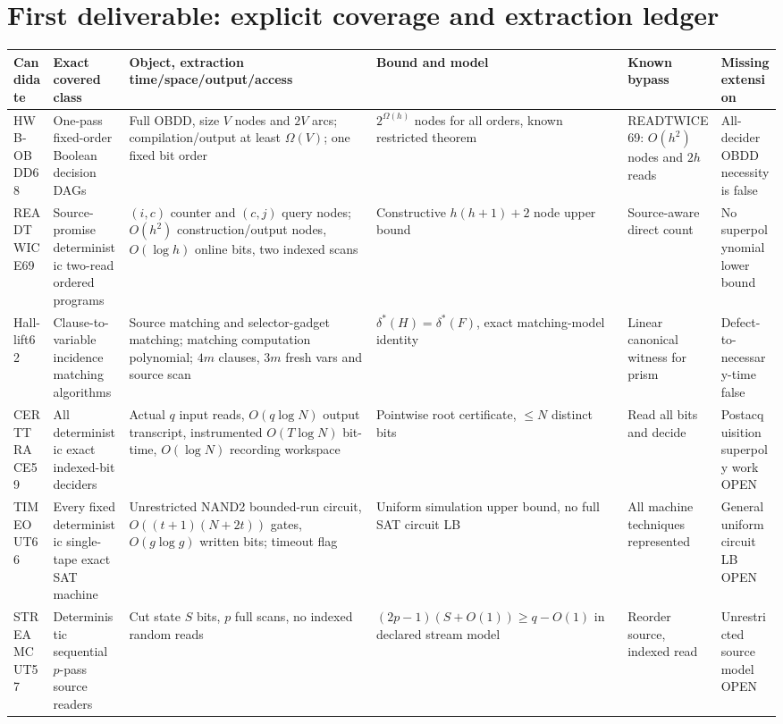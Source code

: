 \documentclass[11pt]{article}
\begin{document}
\section{First deliverable: explicit coverage and extraction ledger}
\scriptsize
\begin{longtable}{@{}p{.13\linewidth}p{.13\linewidth}p{.23\linewidth}p{.18\linewidth}p{.16\linewidth}p{.13\linewidth}@{}}
\toprule
Candidate & Exact covered class & Object, extraction time/space/output/access & Bound and model & Known bypass & Missing extension\\ \midrule \endhead
HWB-OBDD68 & One-pass fixed-order Boolean decision DAGs & Full OBDD, size $V$ nodes and $2V$ arcs; compilation/output at least $\Omega(V)$; one fixed bit order & $2^{\Omega(h)}$ nodes for all orders, known restricted theorem & READTWICE69: $O(h^2)$ nodes and $2h$ reads & All-decider OBDD necessity is false\\
READTWICE69 & Source-promise deterministic two-read ordered programs & $(i,c)$ counter and $(c,j)$ query nodes; $O(h^2)$ construction/output nodes, $O(\log h)$ online bits, two indexed scans & Constructive $h(h+1)+2$ node upper bound & Source-aware direct count & No superpolynomial lower bound\\
Hall-lift62 & Clause-to-variable incidence matching algorithms & Source matching and selector-gadget matching; matching computation polynomial; $4m$ clauses, $3m$ fresh vars and source scan & $\delta^*(H)=\delta^*(F)$, exact matching-model identity & Linear canonical witness for prism & Defect-to-necessary-time false\\
CERTTRACE59 & All deterministic exact indexed-bit deciders & Actual $q$ input reads, $O(q\log N)$ output transcript, instrumented $O(T\log N)$ bit-time, $O(\log N)$ recording workspace & Pointwise root certificate, $\le N$ distinct bits & Read all bits and decide & Postacquisition superpoly work OPEN\\
TIMEOUT66 & Every fixed deterministic single-tape exact SAT machine & Unrestricted NAND2 bounded-run circuit, $O((t+1)(N+2t))$ gates, $O(g\log g)$ written bits; timeout flag & Uniform simulation upper bound, no full SAT circuit LB & All machine techniques represented & General uniform circuit LB OPEN\\
STREAMCUT57 & Deterministic sequential $p$-pass source readers & Cut state $S$ bits, $p$ full scans, no indexed random reads & $(2p-1)(S+O(1))\ge q-O(1)$ in declared stream model & Reorder source, indexed read & Unrestricted source model OPEN\\

\end{longtable}
\end{document}
